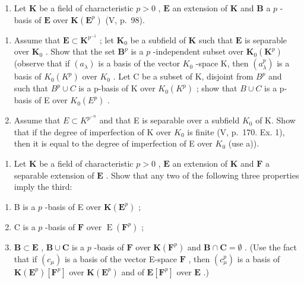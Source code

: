 \BourbakiExerciseGroup

\begin{enumerate}
\def\labelenumi{\arabic{enumi})}
\tightlist
\item
  Let \(\mathbf{K}\) be a field of characteristic \(p > 0\) , \(\mathbf{E}\) an extension of \(\mathbf{K}\) and \(\mathbf{B}\) a \(p\) -basis of \(\mathbf{E}\) over \(\mathbf{K}(\mathbf{E}^p)\) (V, p.~98).
\end{enumerate}

\begin{enumerate}
\def\labelenumi{\alph{enumi})}
\item
  Assume that \(\mathbf{E} \subset \mathbf{K}^{p^{-1}}\) ; let \(\mathbf{K}_0\) be a subfield of \(\mathbf{K}\) such that \(\mathbf{E}\) is separable over \(\mathbf{K}_0\) . Show that the set \(\mathbf{B}^p\) is a \(p\) -independent subset over \(\mathbf{K}_0(\mathbf{K}^p)\) (observe that if \((a_{\lambda})\) is a basis of the vector \(K_{0}\) -space K, then \((a_{\lambda}^{p})\) is a basis of \(K_{0}(K^{p})\) over \(K_{0}\) . Let C be a subset of K, disjoint from \(B^{p}\) and such that \(B^{p} \cup C\) is a p-basis of K over \(K_{0}(K^{p})\) ; show that \(B \cup C\) is a p-basis of E over \(K_{0}(E^{p})\) .
\item
  Assume that \(E \subset K^{p^{-n}}\) and that E is separable over a subfield \(K_{0}\) of K. Show that if the degree of imperfection of K over \(K_{0}\) is finite (V, p.~170. Ex. 1), then it is equal to the degree of imperfection of E over \(K_{0}\) (use a)).
\end{enumerate}

\begin{enumerate}
\def\labelenumi{\arabic{enumi})}
\setcounter{enumi}{1}
\tightlist
\item
  Let \(\mathbf{K}\) be a field of characteristic \(p > 0\) , \(\mathbf{E}\) an extension of \(\mathbf{K}\) and \(\mathbf{F}\) a separable extension of \(\mathbf{E}\) . Show that any two of the following three properties imply the third:
\end{enumerate}

\begin{enumerate}
\def\labelenumi{\alph{enumi})}
\item
  B is a \(p\) -basis of E over \(\mathbf{K}(\mathbf{E}^p)\) ;
\item
  C is a \(p\) -basis of \(\mathbf{F}\) over \(\operatorname{E}(\mathbf{F}^p)\) ;
\item
  \(\mathbf{B} \subset \mathbf{E}\) , \(\mathbf{B} \cup \mathbf{C}\) is a \(p\) -basis of \(\mathbf{F}\) over \(\mathbf{K}(\mathbf{F}^p)\) and \(\mathbf{B} \cap \mathbf{C} = \emptyset\) . (Use the fact that if \((c_{\mu})\) is a basis of the vector E-space \(\mathbf{F}\) , then \((c_{\mu}^p)\) is a basis of \(\mathbf{K}(\mathbf{E}^p)[\mathbf{F}^p]\) over \(\mathbf{K}(\mathbf{E}^p)\) and of \(\mathbf{E}[\mathbf{F}^p]\) over \(\mathbf{E}\) .)
\end{enumerate}


